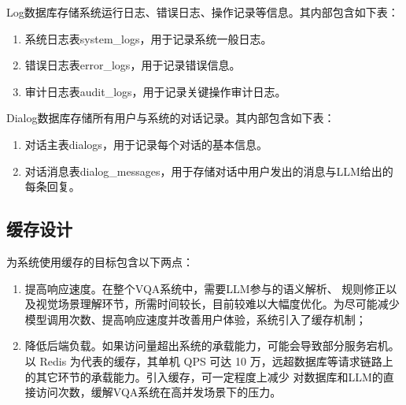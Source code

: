\begin{table}[h]
    \centering
    \renewcommand{\arraystretch}{1.3} %
    \caption{rule\_condition表字段设置及说明}
    \label{tab:rule_conditions}
\end{table}

Log数据库存储系统运行日志、错误日志、操作记录等信息。其内部包含如下表：
\begin{enumerate}[nosep]
\item 系统日志表system\_logs，用于记录系统一般日志。
\item 错误日志表error\_logs，用于记录错误信息。
\item 审计日志表audit\_logs，用于记录关键操作审计日志。
\end{enumerate}

Dialog数据库存储所有用户与系统的对话记录。其内部包含如下表：
\begin{enumerate}[nosep]
\item 对话主表dialogs，用于记录每个对话的基本信息。
\item 对话消息表dialog\_messages，用于存储对话中用户发出的消息与LLM给出的每条回复。
\end{enumerate}

\subsection{缓存设计}
为系统使用缓存的目标包含以下两点：
\begin{enumerate}[nosep]
\item 提高响应速度。在整个VQA系统中，需要LLM参与的语义解析、
规则修正以及视觉场景理解环节，所需时间较长，目前较难以大幅度优化。为尽可能减少模型调用次数、提高响应速度并改善用户体验，系统引入了缓存机制；
\item 降低后端负载。如果访问量超出系统的承载能力，可能会导致部分服务宕机。以 Redis 为代表的缓存，其单机 QPS 可达 10 万，远超数据库等请求链路上的其它环节的承载能力。引入缓存，可一定程度上减少
对数据库和LLM的直接访问次数，缓解VQA系统在高并发场景下的压力。
\end{enumerate}

